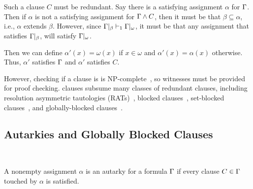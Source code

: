 Such a clause $C$ must be redundant. Say there is a satisfying assignment $\alpha$ for $\Gamma$. Then if $\alpha$ is not a satisfying assignment for $\Gamma \land C$, then it must be that $\beta \subseteq \alpha$, i.e., $\alpha$ extends $\beta$. However, since $\Gamma|_\beta \vdash_1 \Gamma|_\omega$, it must be that any assignment that satisfies $\Gamma|_\beta$, will satisfy $\Gamma|_\omega$. 

Then we can define $\alpha' (x) = \omega(x)$ if $x \in \omega$ and $\alpha'(x) = \alpha(x)$ otherwise. Thus, $\alpha'$ satisfies $\Gamma$ and $\alpha'$ satisfies $C$.




However, checking if a clause is \pr is NP-complete~\cite{prclause}, so witnesses must be provided for proof checking. \pr clauses subsume many classes of redundant clauses, including resolution asymmetric tautologies (RATs)~\cite{rat}, blocked clauses~\cite{blockedclause}, set-blocked clauses~\cite{setblocked}, and globally-blocked clauses~\cite{conditionalautarkies}.

\subsection{Autarkies and Globally Blocked Clauses}~\label{subsec:autarkies}


\begin{definition}[Autarky]
    A nonempty assignment $\alpha$ is an autarky for a formula $\Gamma$ if every clause $C \in \Gamma$ touched by $\alpha$ is satisfied.
\end{definition}


